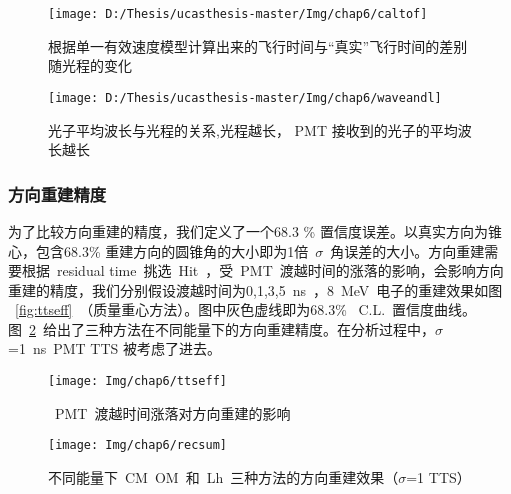 \begin{figure}[!htb]
\begin{minipage}[t]{0.48\linewidth}
  \centering
    \texttt{[image: D:/Thesis/ucasthesis-master/Img/chap6/caltof]}
    \caption{根据单一有效速度模型计算出来的飞行时间与``真实''飞行时间的差别随光程的变化}
    \label{fig:tofcal_1}
  \end{minipage}
    \quad\quad
  \begin{minipage}[t]{0.48\linewidth}
  \centering
    \texttt{[image: D:/Thesis/ucasthesis-master/Img/chap6/waveandl]}
    \caption{光子平均波长与光程的关系,光程越长， PMT 接收到的光子的平均波长越长}
    \label{fig:tofcal_2}
    \end{minipage}
\end{figure}


\subsubsection{方向重建精度}
为了比较方向重建的精度，我们定义了一个68.3 \% 置信度误差。以真实方向为锥心，包含68.3\% 重建方向的圆锥角的大小即为1倍~$\sigma$~角误差的大小。方向重建需要根据~residual time~挑选~Hit~，受~PMT~渡越时间的涨落的影响，会影响方向重建的精度，我们分别假设渡越时间为0,1,3,5~ns~，8~MeV~电子的重建效果如图
~\ref{fig:ttseff}~（质量重心方法）。图中灰色虚线即为68.3\% ~C.L.~置信度曲线。图~\ref{fig:recsum}~给出了三种方法在不同能量下的方向重建精度。在分析过程中，$\sigma$=1~ns~PMT TTS 被考虑了进去。

\begin{figure}[!htbp]
\begin{minipage}[t]{0.48\linewidth}
  \centering
   \texttt{[image: Img/chap6/ttseff]}
    \caption{~PMT~渡越时间涨落对方向重建的影响}
  \label{fig:ttseff}
\end{minipage}
 \quad\quad
\begin{minipage}[t]{0.48\linewidth}
  \centering
   \texttt{[image: Img/chap6/recsum]}
    \caption{不同能量下~CM~OM~和~Lh~三种方法的方向重建效果（$\sigma$=1 TTS）}
  \label{fig:recsum}
\end{minipage}
\end{figure}
